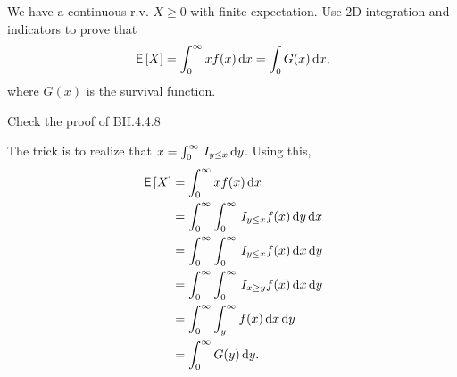 \begin{exercise}
We have a continuous r.v. $X\geq 0$ with finite expectation. Use 2D integration and indicators to prove that
\begin{align}
\,\mathsf{E}\left[X\right] = \int_{0}^{\infty} x f(x) \,\textrm{d}x = \int_{0} G(x) \,\textrm{d}x,
\end{align}
where $G(x)$ is the survival function.
\begin{hint}
  Check the proof of BH.4.4.8
\end{hint}
\begin{solution}
The trick is to realize that $x = \int_0^{\infty} \,I_{y\leq x} \,\textrm{d}y$. Using this,
\begin{align}
\,\mathsf{E}\left[X\right]
&= \int_{0}^{\infty} x f(x) \,\textrm{d}x \\
&= \int_{0}^{\infty} \int_{0}^{\infty} \,I_{y \leq x} f(x) \,\textrm{d}y \,\textrm{d}x \\
&= \int_{0}^{\infty} \int_{0}^{\infty} \,I_{y \leq x} f(x) \,\textrm{d}x \,\textrm{d}y \\
&= \int_{0}^{\infty} \int_{0}^{\infty} \,I_{x \geq y} f(x) \,\textrm{d}x \,\textrm{d}y \\
&= \int_{0}^{\infty} \int_{y}^{\infty} f(x) \,\textrm{d}x \,\textrm{d}y \\
&= \int_{0}^{\infty} G(y) \,\textrm{d}y.
\end{align}
\end{solution}
\end{exercise}


